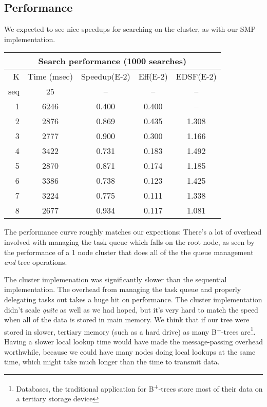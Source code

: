 \documentclass[conference]{IEEEtran}
\begin{document}
\subsection{Performance}
We expected to see nice speedups for searching on the cluster, as with our SMP
implementation.
\begin{center}
\begin{tabular}{ | r | c | c | c | c | }
\hline
\multicolumn{5}{|c|}{Search performance (1000 searches)}\\\hline\hline
K & Time (msec) & Speedup({\small E}-2) & Eff({\small E}-2) & EDSF({\small E}-2) \\\hline
seq & 25 & \--- & \--- & \--- \\\hline
1&6246 & 0.400 & 0.400 & \--- \\\hline
2&2876 & 0.869 & 0.435 & 1.308 \\\hline
3&2777 & 0.900 & 0.300 & 1.166 \\\hline
4&3422 & 0.731 & 0.183 & 1.492 \\\hline
5&2870 & 0.871 & 0.174 & 1.185 \\\hline
6&3386 & 0.738 & 0.123 & 1.425 \\\hline
7&3224 & 0.775 & 0.111 & 1.338 \\\hline
8&2677 & 0.934 & 0.117 & 1.081 \\\hline
\end{tabular}
\end{center}
The performance curve roughly matches our expections: There's a lot of overhead
involved with managing the task queue which falls on the root node, as seen by
the performance of a 1 node cluster that does all of the the queue management
{\em and} tree operations.

The cluster implemenation was significantly slower than the sequential
implementation. The overhead from managing the task queue and properly
delegating tasks out takes a huge hit on performance. The cluster implementation
didn't scale {\em quite} as well as we had hoped, but it's very hard to match
the speed when all of the data is stored in main memory. We think that if our
tree were stored in slower, tertiary memory (such as a hard drive) as many
B\textsuperscript{+}-trees are\footnote{Databases, the traditional application
for B\textsuperscript{+}-trees store most of their data on a tertiary storage
device}. Having a slower local lookup time would have made the message-passing
overhead worthwhile, because we could have many nodes doing local lookups at the
same time, which might take much longer than the time to transmit data.
\end{document}
